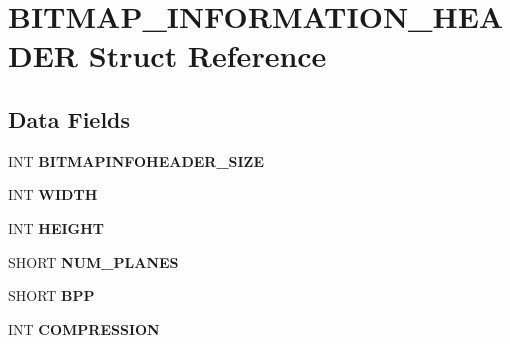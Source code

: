 \hypertarget{struct_b_i_t_m_a_p___i_n_f_o_r_m_a_t_i_o_n___h_e_a_d_e_r}{}\section{B\+I\+T\+M\+A\+P\+\_\+\+I\+N\+F\+O\+R\+M\+A\+T\+I\+O\+N\+\_\+\+H\+E\+A\+D\+ER Struct Reference}
\label{struct_b_i_t_m_a_p___i_n_f_o_r_m_a_t_i_o_n___h_e_a_d_e_r}
\subsection*{Data Fields}
\begin{DoxyCompactItemize}
\item 
I\+NT {\bfseries B\+I\+T\+M\+A\+P\+I\+N\+F\+O\+H\+E\+A\+D\+E\+R\+\_\+\+S\+I\+ZE}\hypertarget{struct_b_i_t_m_a_p___i_n_f_o_r_m_a_t_i_o_n___h_e_a_d_e_r_afd4ca64510fe69034359f6065ad1d34f}{}\label{struct_b_i_t_m_a_p___i_n_f_o_r_m_a_t_i_o_n___h_e_a_d_e_r_afd4ca64510fe69034359f6065ad1d34f}

\item 
I\+NT {\bfseries W\+I\+D\+TH}\hypertarget{struct_b_i_t_m_a_p___i_n_f_o_r_m_a_t_i_o_n___h_e_a_d_e_r_a03be4a250788c557d73dd54ee79093d9}{}\label{struct_b_i_t_m_a_p___i_n_f_o_r_m_a_t_i_o_n___h_e_a_d_e_r_a03be4a250788c557d73dd54ee79093d9}

\item 
I\+NT {\bfseries H\+E\+I\+G\+HT}\hypertarget{struct_b_i_t_m_a_p___i_n_f_o_r_m_a_t_i_o_n___h_e_a_d_e_r_a6c8f69ac4a9418a6d7e53b4d3c302aa8}{}\label{struct_b_i_t_m_a_p___i_n_f_o_r_m_a_t_i_o_n___h_e_a_d_e_r_a6c8f69ac4a9418a6d7e53b4d3c302aa8}

\item 
S\+H\+O\+RT {\bfseries N\+U\+M\+\_\+\+P\+L\+A\+N\+ES}\hypertarget{struct_b_i_t_m_a_p___i_n_f_o_r_m_a_t_i_o_n___h_e_a_d_e_r_a0f9264746215b896b69bd8ac29981c2a}{}\label{struct_b_i_t_m_a_p___i_n_f_o_r_m_a_t_i_o_n___h_e_a_d_e_r_a0f9264746215b896b69bd8ac29981c2a}

\item 
S\+H\+O\+RT {\bfseries B\+PP}\hypertarget{struct_b_i_t_m_a_p___i_n_f_o_r_m_a_t_i_o_n___h_e_a_d_e_r_a78dabb55fff1abfb2e97a7bc2de17610}{}\label{struct_b_i_t_m_a_p___i_n_f_o_r_m_a_t_i_o_n___h_e_a_d_e_r_a78dabb55fff1abfb2e97a7bc2de17610}

\item 
I\+NT {\bfseries C\+O\+M\+P\+R\+E\+S\+S\+I\+ON}\hypertarget{struct_b_i_t_m_a_p___i_n_f_o_r_m_a_t_i_o_n___h_e_a_d_e_r_a7727be08d81df600cfbd75c458ef2169}{}\label{struct_b_i_t_m_a_p___i_n_f_o_r_m_a_t_i_o_n___h_e_a_d_e_r_a7727be08d81df600cfbd75c458ef2169}


\end{DoxyCompactItemize}
